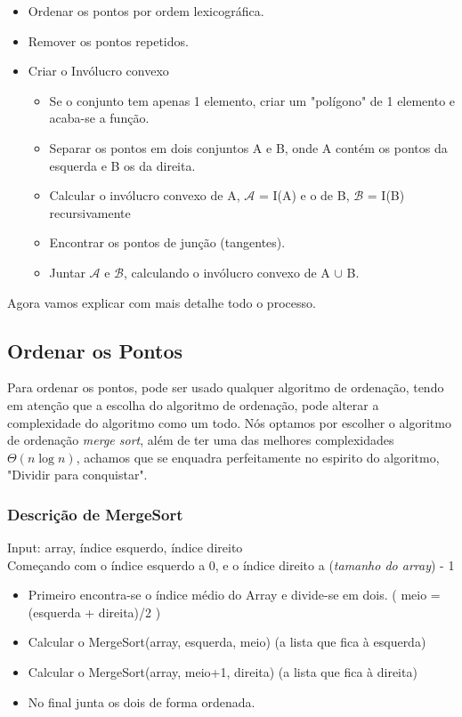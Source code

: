 \documentclass[11pt]{article}
\begin{document}
\begin{itemize}
    \item Ordenar os pontos por ordem lexicográfica.
    \item Remover os pontos repetidos.
    \item Criar o Invólucro convexo
    \begin{itemize}
        \item Se o conjunto tem apenas 1 elemento, criar um "polígono"
            de 1 elemento e acaba-se a função.
        \item Separar os pontos em dois conjuntos A e B, 
            onde A contém os pontos da esquerda e B os da direita.
        \item Calcular o invólucro convexo de A, 
            $\mathcal{A}$ = I(A) e o de B, $\mathcal{B}$ = I(B) recursivamente
        \item Encontrar os pontos de junção (tangentes).
        \item Juntar $\mathcal{A}$ e $\mathcal{B}$, 
            calculando o invólucro convexo de A $\cup$ B.
    \end{itemize}
\end{itemize}

Agora vamos explicar com mais detalhe todo o processo.
\subsection{ Ordenar os Pontos }
Para ordenar os pontos, pode ser usado qualquer algoritmo de ordenação,
tendo em atenção que a escolha do algoritmo de ordenação, pode alterar a
complexidade do algoritmo como um todo.
Nós optamos por escolher o algoritmo de ordenação \textit{merge sort},
além de ter uma das melhores complexidades $\Theta(n\log{}n)$, achamos 
que se enquadra perfeitamente no espirito do algoritmo, "Dividir para conquistar".

\subsubsection{Descrição de MergeSort}
Input: array, índice esquerdo, índice direito\\

Começando com o índice esquerdo a 0, e o índice direito a (\textit{tamanho do array}) - 1
\begin{itemize}
    \item Primeiro encontra-se o índice médio do Array e divide-se em dois. 
        ( meio = (esquerda + direita)/2 )
    \item Calcular o MergeSort(array, esquerda, meio) (a lista que fica à esquerda)
    \item Calcular o MergeSort(array, meio+1, direita) (a lista que fica à direita)
    \item No final junta os dois de forma ordenada.
\end{itemize}
\end{document}
